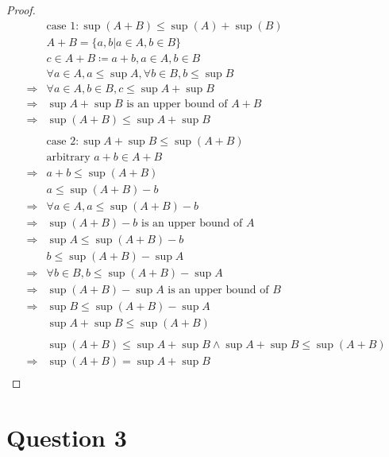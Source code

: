 \documentclass{article}
\begin{document}
\begin{proof}
    \begin{align*}
        &\text{case 1}:\sup(A+B)\leqslant\sup(A)+\sup(B)\\
        &A+B=\{a,b|a\in A,b\in B\}\\
        &c\in A+B\coloneqq a+b,a\in A,b\in B\\
        &\forall a\in A, a\leqslant \sup A, \forall b\in B, b\leqslant \sup B\\
        \Rightarrow&\forall a\in A, b\in B, c\leqslant \sup A+\sup B\\
        \Rightarrow&\sup A+\sup B\text{ is an upper bound of }A+B\\
        \Rightarrow&\sup(A+B)\leqslant \sup A+\sup B\\
        &\\
        &\text{case 2}:\sup A+\sup B\leqslant \sup(A+B)\\
        &\text{arbitrary }a+b\in A+B\\
        \Rightarrow&a+b\leqslant \sup(A+B)\\
        &a\leqslant \sup(A+B)-b\\
        \Rightarrow&\forall a\in A,a\leqslant \sup(A+B)-b\\
        \Rightarrow&\sup(A+B)-b\text{ is an upper bound of }A\\
        \Rightarrow&\sup A\leqslant \sup(A+B)-b\\
        &b\leqslant \sup(A+B)-\sup A\\
        \Rightarrow&\forall b\in B,b\leqslant \sup(A+B)-\sup A\\
        \Rightarrow&\sup(A+B)-\sup A\text{ is an upper bound of }B\\
        \Rightarrow&\sup B\leqslant \sup(A+B)-\sup A\\
        &\sup A+\sup B\leqslant \sup(A+B)\\
        &\\
        &\sup(A+B)\leqslant \sup A+\sup B\land \sup A+\sup B\leqslant \sup(A+B)\\
        \Rightarrow&\sup(A+B)=\sup A+\sup B\\
    \end{align*}
\end{proof}

\newpage

\section*{Question 3}
\end{document}
